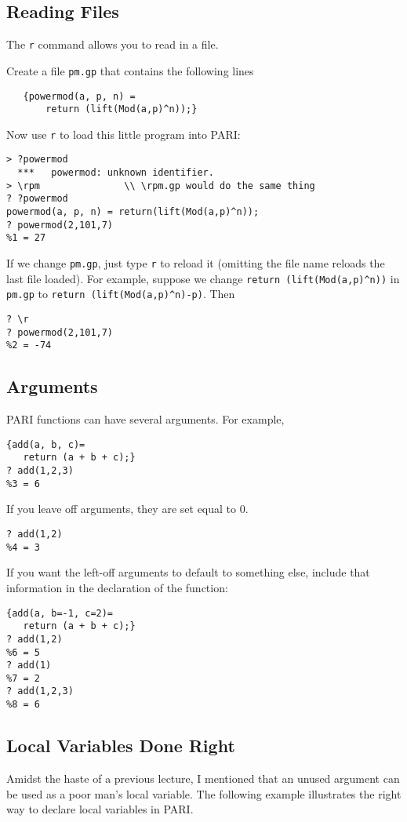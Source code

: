 \documentclass[11pt]{report}
\begin{document}
\subsection{Reading Files}
The {\tt \bs{}r} command allows you to read in a file.
\begin{example}
  Create a file {\tt pm.gp} that contains the following lines
  \begin{verbatim}
   {powermod(a, p, n) = 
       return (lift(Mod(a,p)^n));}
\end{verbatim}
  Now use {\tt \bs{}r} to load this little program into PARI:

  \begin{verbatim}
> ?powermod
  ***   powermod: unknown identifier.
> \rpm               \\ \rpm.gp would do the same thing
? ?powermod
powermod(a, p, n) = return(lift(Mod(a,p)^n));
? powermod(2,101,7)
%1 = 27
\end{verbatim}
  If we change {\tt pm.gp}, just type {\tt \bs{}r} to reload
  it (omitting the file name reloads the last file loaded).
  For example, suppose we change
  {\tt return (lift(Mod(a,p)\^{}n))} in {\tt pm.gp} to
  {\tt return (lift(Mod(a,p)\^{}n)-p)}.  Then
  \begin{verbatim}
? \r
? powermod(2,101,7)
%2 = -74
\end{verbatim}
\end{example}



\subsection{Arguments}
PARI functions can have several arguments.  For
example,
\begin{verbatim}
{add(a, b, c)=
   return (a + b + c);}
? add(1,2,3)
%3 = 6
\end{verbatim}
If you leave off arguments, they are set equal to $0$.
\begin{verbatim}
? add(1,2)
%4 = 3
\end{verbatim}
If you want the left-off arguments to default to something
else, include that information in the declaration of the function:
\begin{verbatim}
{add(a, b=-1, c=2)=
   return (a + b + c);}
? add(1,2)
%6 = 5
? add(1)
%7 = 2
? add(1,2,3)
%8 = 6
\end{verbatim}

\subsection{Local Variables Done Right}
Amidst the haste of a previous lecture, I mentioned that an unused
argument can be used as a poor man's local variable.   The following
example illustrates the right way to declare local variables in PARI.
\end{document}
